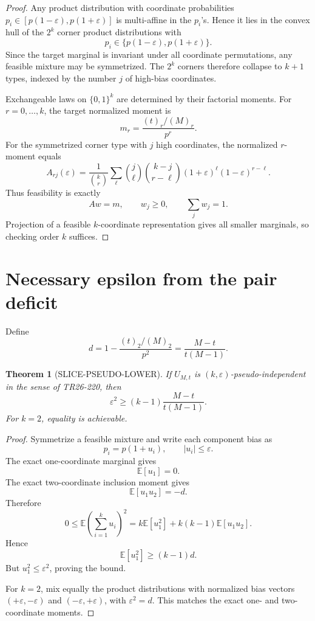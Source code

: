 \documentclass[11pt]{article}
\newtheorem{theorem}{Theorem}
\begin{document}
\begin{proof}
Any product distribution with coordinate probabilities
\(p_i\in[p(1-\varepsilon),p(1+\varepsilon)]\) is multi-affine in the
\(p_i\)'s. Hence it lies in the convex hull of the \(2^k\) corner product
distributions with
\[
p_i\in\{p(1-\varepsilon),p(1+\varepsilon)\}.
\]
Since the target marginal is invariant under all coordinate permutations, any
feasible mixture may be symmetrized. The \(2^k\) corners therefore collapse
to \(k+1\) types, indexed by the number \(j\) of high-bias coordinates.

Exchangeable laws on \(\{0,1\}^k\) are determined by their factorial moments.
For \(r=0,\ldots,k\), the target normalized moment is
\[
m_r
=
\frac{(t)_r/(M)_r}{p^r}.
\]
For the symmetrized corner type with \(j\) high coordinates, the normalized
\(r\)-moment equals
\[
A_{rj}(\varepsilon)
=
\frac1{\binom kr}
\sum_\ell
\binom j\ell
\binom{k-j}{r-\ell}
(1+\varepsilon)^\ell
(1-\varepsilon)^{r-\ell}.
\]
Thus feasibility is exactly
\[
Aw=m,
\qquad
w_j\ge0,
\qquad
\sum_j w_j=1.
\]
Projection of a feasible \(k\)-coordinate representation gives all smaller
marginals, so checking order \(k\) suffices.
\end{proof}

\section{Necessary epsilon from the pair deficit}

Define
\[
d
=
1-
\frac{(t)_2/(M)_2}{p^2}
=
\frac{M-t}{t(M-1)}.
\]

\begin{theorem}[SLICE-PSEUDO-LOWER]
If \(U_{M,t}\) is \((k,\varepsilon)\)-pseudo-independent in the sense of
TR26-220, then
\[
\boxed{
\varepsilon^2
\ge
(k-1)\frac{M-t}{t(M-1)}
}.
\]
For \(k=2\), equality is achievable.
\end{theorem}

\begin{proof}
Symmetrize a feasible mixture and write each component bias as
\[
p_i=p(1+u_i),
\qquad |u_i|\le\varepsilon.
\]
The exact one-coordinate marginal gives
\[
\mathbb E[u_1]=0.
\]
The exact two-coordinate inclusion moment gives
\[
\mathbb E[u_1u_2]=-d.
\]
Therefore
\[
0
\le
\mathbb E\left(\sum_{i=1}^k u_i\right)^2
=
k\mathbb E[u_1^2]
+
k(k-1)\mathbb E[u_1u_2].
\]
Hence
\[
\mathbb E[u_1^2]\ge(k-1)d.
\]
But \(u_1^2\le\varepsilon^2\), proving the bound.

For \(k=2\), mix equally the product distributions with normalized bias
vectors \((+\varepsilon,-\varepsilon)\) and
\((-\varepsilon,+\varepsilon)\), with \(\varepsilon^2=d\).
This matches the exact one- and two-coordinate moments.
\end{proof}
\end{document}
